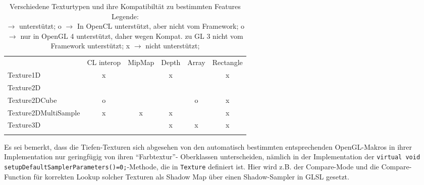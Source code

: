   	
  	\begin{table}[!h]
  		\begin{tabular}
  		{
  			|l|c|c|c|c|c|
  		}
		\noalign{\hrule}						
  						&	CL interop	&	MipMap	& Depth	&	Array	&	Rectangle	\\
  		\noalign{\hrule}						
  		Texture1D		& {\color{red}x} & {\color{green}\checkmark} & {\color{red}x}
  						& {\color{green}\checkmark} & {\color{red}x} \\
		\noalign{\hrule}						
  		Texture2D		& {\color{green}\checkmark} & {\color{green}\checkmark} & {\color{green}\checkmark}  
  						& {\color{green}\checkmark} & {\color{green}\checkmark} \\
  		\noalign{\hrule}						
  		Texture2DCube 	& {\color{yellow}o} & {\color{green}\checkmark}  & {\color{green}\checkmark}
  						& {\color{orange}o} & {\color{red}x} \\
  		\noalign{\hrule}						
  		Texture2DMultiSample& {\color{red}x} & {\color{red}x}  & {\color{red}x} 
  						& {\color{green}\checkmark} & {\color{red}x} \\	
  		\noalign{\hrule}						
  		Texture3D		& {\color{green}\checkmark} & {\color{green}\checkmark}  & {\color{red}x} 
  						& {\color{red}x} & {\color{red}x} \\
  		\noalign{\hrule}						
  		\end{tabular}
  		
  		\caption{Verschiedene Texturtypen und ihre Kompatibiltät zu bestimmten Features \\	
  			Legende: \\
			{\color{green}\checkmark}	$\rightarrow$ unterstützt;
			{\color{yellow}o}	$\rightarrow$ In OpenCL unterstützt, aber nicht vom Framework;
			{\color{orange}o}	$\rightarrow$ nur in OpenGL 4 unterstützt,
								daher wegen Kompat. zu GL 3 nicht vom Framework unterstützt;
			{\color{red}x}	$\rightarrow$ nicht unterstützt;
		}
  		\label{tab:textureTypes}
	\end{table}
	
	Es sei bemerkt, dass die Tiefen-Texturen sich abgesehen von den automatisch bestimmten
	entsprechenden OpenGL-Makros in ihrer Implementation nur geringfügig von ihren "`Farbtextur"'-
	Oberklassen unterscheiden, nämlich in der Implementation der 
	\lstinline|virtual void setupDefaultSamplerParameters()=0;|-Methode, die in \lstinline|Texture| definiert ist.
	Hier wird z.B. der Compare-Mode und die Compare-Function für korrekten Lookup solcher Texturen als Shadow Map
	über einen	Shadow-Sampler in GLSL gesetzt.
	
